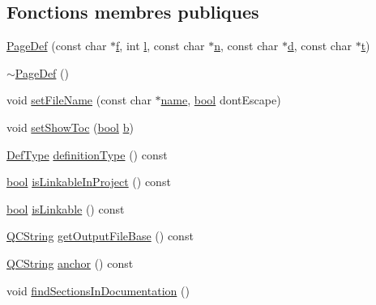\subsection*{Fonctions membres publiques}
\begin{DoxyCompactItemize}
\item 
\hyperlink{class_page_def_a42a37bcdc01bf39d2488eb8c7303f74c}{Page\+Def} (const char $\ast$\hyperlink{060__command__switch_8tcl_af6830d2c644b45088ea8f1f74a46b778}{f}, int \hyperlink{060__command__switch_8tcl_aff56f84b49947b84b2a304f51cf8e678}{l}, const char $\ast$\hyperlink{060__command__switch_8tcl_acdde3cd86eb2421ce8dbb2e85227d368}{n}, const char $\ast$\hyperlink{060__command__switch_8tcl_af43f4b1f0064a33b2d662af9f06d3a00}{d}, const char $\ast$\hyperlink{058__bracket__recursion_8tcl_a69e959f6901827e4d8271aeaa5fba0fc}{t})
\item 
\hyperlink{class_page_def_af1a3b8795d28ca2720a0c351c4ae49a2}{$\sim$\+Page\+Def} ()
\item 
void \hyperlink{class_page_def_a3744fed06d2c549bfe926a89053183da}{set\+File\+Name} (const char $\ast$\hyperlink{class_definition_a99481361779e85f0c1556709de7d9e5b}{name}, \hyperlink{qglobal_8h_a1062901a7428fdd9c7f180f5e01ea056}{bool} dont\+Escape)
\item 
void \hyperlink{class_page_def_ad9bd5ed9b59ac2197a6bdd19d6db64e1}{set\+Show\+Toc} (\hyperlink{qglobal_8h_a1062901a7428fdd9c7f180f5e01ea056}{bool} \hyperlink{060__command__switch_8tcl_a68bdb74c144118d936931c46f75d4b3e}{b})
\item 
\hyperlink{class_definition_intf_ada60114bc621669dd8c19edfc6421766}{Def\+Type} \hyperlink{class_page_def_aa36b59729c2e8dc01489b54d709fd770}{definition\+Type} () const 
\item 
\hyperlink{qglobal_8h_a1062901a7428fdd9c7f180f5e01ea056}{bool} \hyperlink{class_page_def_a4567ac4d4f7de748f54fd6d0157e32f8}{is\+Linkable\+In\+Project} () const 
\item 
\hyperlink{qglobal_8h_a1062901a7428fdd9c7f180f5e01ea056}{bool} \hyperlink{class_page_def_acebec06d0ff3e2e184eeba1d8e281a9b}{is\+Linkable} () const 
\item 
\hyperlink{class_q_c_string}{Q\+C\+String} \hyperlink{class_page_def_aa08ebea225e51faed63111ba64e78960}{get\+Output\+File\+Base} () const 
\item 
\hyperlink{class_q_c_string}{Q\+C\+String} \hyperlink{class_page_def_ad505a61a9af54612d5ff54748fef981e}{anchor} () const 
\item 
void \hyperlink{class_page_def_ac25a2b575428b1252acf0b71e213a7b4}{find\+Sections\+In\+Documentation} ()

\end{DoxyCompactItemize}

